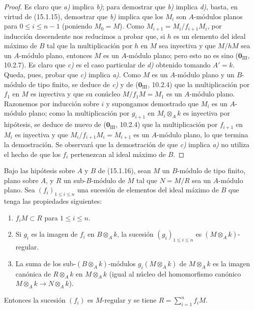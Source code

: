 \begin{proof}
Es claro que \emph{a)} implica \emph{b)}; para demostrar que \emph{b)} implica \emph{d)}, basta, en virtud
de (15.1.15), demostrar que \emph{b)} implica que los $M_i$ son $A$-módulos planos
para $0\leq i\leq n-1$ (poniendo $M_0=M$). Como
$M_{i+1}=M_i/f_{i+1}M_i$, por inducción descendente nos reducimos a probar que,
si $h$ es un elemento del ideal máximo de $B$ tal que la multiplicación por
$h$ en $M$ sea inyectiva y que $M/hM$ sea un $A$-módulo plano, entonces $M$
es un $A$-módulo plano; pero esto no es sino
($\mathbf{0}_{\mathrm{III}}$, 10.2.7). Es claro que \emph{c)} es el caso particular de \emph{d)}
obtenido tomando $A'=k$. Queda, pues, probar que \emph{c)} implica \emph{a)}. Como $M$ es un
$A$-módulo plano y un $B$-módulo de tipo finito, se deduce de \emph{c)} y de
($\mathbf{0}_{\mathrm{III}}$, 10.2.4) que la multiplicación por $f_1$ en $M$ es
inyectiva y que su conúcleo $M/f_1M=M_1$ es un $A$-módulo plano. Razonemos por
inducción sobre $i$ y supongamos demostrado que $M_i$ es un $A$-módulo plano;
como la multiplicación por $g_{i+1}$ en $M_i\otimes_A k$ es inyectiva por
hipótesis, se deduce de nuevo de ($\mathbf{0}_{\mathrm{III}}$, 10.2.4) que la
multiplicación por $f_{i+1}$ en $M_i$ es inyectiva y que
$M_i/f_{i+1}M_i=M_{i+1}$ es un $A$-módulo plano, lo que termina la
demostración. Se observará que la demostración de que \emph{c)} implica \emph{a)} no utiliza
el hecho de que los $f_i$ pertenezcan al ideal máximo de $B$.
\end{proof}

\begin{corollary}[15.1.17]
\label{0.15.1.17-es}
Bajo las hipótesis sobre $A$ y $B$ de \textup{(15.1.16)}, sean $M$ un $B$-módulo de
tipo finito, plano sobre $A$, y $R$ un sub-$B$-módulo de $M$ tal que $N=M/R$
sea un $A$-módulo plano. Sea $(f_i)_{1\leq i\leq n}$ una sucesión de elementos
del ideal máximo de $B$ que tenga las propiedades siguientes:
\begin{enumerate}
  \item[\textup{(i)}] $f_iM\subset R$ para $1\leq i\leq n$.
  \item[\textup{(ii)}] Si $g_i$ es la imagen de $f_i$ en $B\otimes_A k$, la sucesión
  $(g_i)_{1\leq i\leq n}$ es $(M\otimes_A k)$-regular.
  \item[\textup{(iii)}] La suma de los sub-$(B\otimes_A k)$-módulos
  $g_i(M\otimes_A k)$ de $M\otimes_A k$ es la imagen canónica de
  $R\otimes_A k$ en $M\otimes_A k$ (igual al núcleo del homomorfismo canónico
  $M\otimes_A k\to N\otimes_A k$).
\end{enumerate}
Entonces la sucesión $(f_i)$ es $M$-regular y se tiene
$R=\sum_{i=1}^n f_iM$.
\end{corollary}

